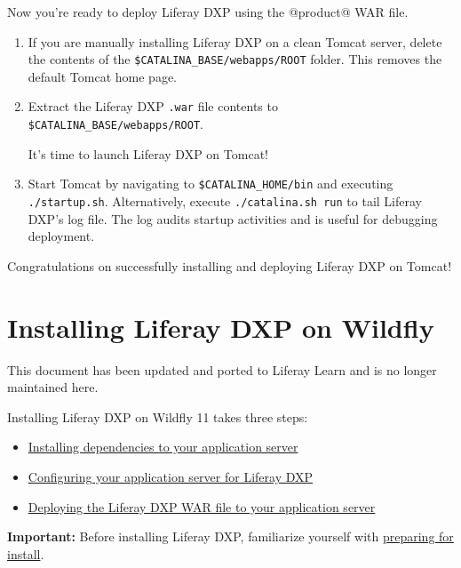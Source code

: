 Now you're ready to deploy Liferay DXP using the @product@ WAR file.

\begin{enumerate}
\def\labelenumi{\arabic{enumi}.}
\item
  If you are manually installing Liferay DXP on a clean Tomcat server,
  delete the contents of the \texttt{\$CATALINA\_BASE/webapps/ROOT}
  folder. This removes the default Tomcat home page.
\item
  Extract the Liferay DXP \texttt{.war} file contents to
  \texttt{\$CATALINA\_BASE/webapps/ROOT}.

  It's time to launch Liferay DXP on Tomcat!
\item
  Start Tomcat by navigating to \texttt{\$CATALINA\_HOME/bin} and
  executing \texttt{./startup.sh}. Alternatively, execute
  \texttt{./catalina.sh\ run} to tail Liferay DXP's log file. The log
  audits startup activities and is useful for debugging deployment.
\end{enumerate}

Congratulations on successfully installing and deploying Liferay DXP on
Tomcat!

\chapter{Installing Liferay DXP on
Wildfly}\label{installing-liferay-dxp-on-wildfly}

{This document has been updated and ported to Liferay Learn and is no
longer maintained here.}

Installing Liferay DXP on Wildfly 11 takes three steps:

\begin{itemize}
\tightlist
\item
  \hyperref[installing-dependencies]{Installing dependencies to your
  application server}
\item
  \hyperref[configuring-wildfly]{Configuring your application server for
  Liferay DXP}
\item
  \hyperref[deploying-product]{Deploying the Liferay DXP WAR file to
  your application server}
\end{itemize}

\noindent\hrulefill

\textbf{Important:} Before installing Liferay DXP, familiarize yourself
with
\href{/docs/7-2/deploy/-/knowledge_base/d/preparing-for-install}{preparing
for install}.

\noindent\hrulefill

